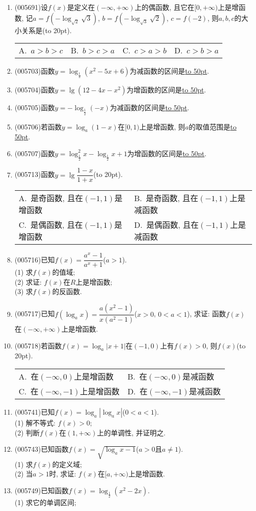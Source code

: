 \documentclass[10pt,a4paper]{article}
\newcommand{\blank}[1]{\underline{\hbox to #1pt{}}}
\newcommand{\bracket}[1]{(\hbox to #1pt{})}
\newcommand{\twoch}[4]{\par\begin{tabular}{p{.46\textwidth}p{.46\textwidth}}
A.~#1& B.~#2\\
C.~#3& D.~#4
\end{tabular}}
\newcommand{\fourch}[4]{\par\begin{tabular}{p{.23\textwidth}p{.23\textwidth}p{.23\textwidth}p{.23\textwidth}}
A.~#1 &B.~#2& C.~#3& D.~#4
\end{tabular}}
\begin{document}
\begin{enumerate}[1.]
\item {\tiny (005691)}设$f(x)$是定义在$(-\infty ,+\infty)$上的偶函数, 且它在$[0,+\infty)$上是增函数, 记$a=f(-\log_{\sqrt 2}\sqrt 3)$, $b=f(-\log_{\sqrt 3}\sqrt 2)$, $c=f(-2)$, 则$a,b,c$的大小关系是\bracket{20}.
\fourch{$a>b>c$}{$b>c>a$}{$c>a>b$}{$c>b>a$}
\item {\tiny (005703)}函数$y=\log_{\frac 13}(x^2-5x+6)$为减函数的区间是\blank{50}.
\item {\tiny (005704)}函数$y=\lg (12-4x-x^2)$为增函数的区间是\blank{50}.
\item {\tiny (005705)}函数$y=-\log_{\frac 12}(-x)$为减函数的区间是\blank{50}.
\item {\tiny (005706)}若函数$y=\log_a(1-x)$在$[0,1)$上是增函数, 则$a$的取值范围是\blank{50}.
\item {\tiny (005707)}函数$y=\log_{\frac 12}^2x-\log_{\frac 12}x+1$为增函数的区间是\blank{50}.
\item {\tiny (005713)}函数$y=\lg \dfrac{1-x}{1+x}$\bracket{20}.
\twoch{是奇函数, 且在$(-1, 1)$是增函数}{是奇函数, 且在$(-1, 1)$上是减函数}{是偶函数, 且在$(-1, 1)$是增函数}{是偶函数, 且在$(-1, 1)$上是减函数}
\item {\tiny (005716)}已知$f(x)=\dfrac{a^x-1}{a^x+1}$($a>1$).\\
(1) 求$f(x)$的值域;\\
(2) 求证: $f(x)$在$R$上是增函数;\\
(3) 求$f(x)$的反函数.
\item {\tiny (005717)}已知$f(\log_ax)=\dfrac{a(x^2-1)}{x(a^2-1)}$($x>0$, $0<a<1$), 求证: 函数$f(x)$在$(-\infty ,+\infty)$上是增函数.
\item {\tiny (005718)}若函数$f(x)=\log_a|x+1|$在$(-1, 0)$上有$f(x)>0$, 则$f(x)$\bracket{20}.
\twoch{在$(-\infty ,0)$上是增函数}{在$(-\infty ,0)$是减函数}{在$(-\infty ,-1)$上是增函数}{在$(-\infty ,-1)$是减函数}
\item {\tiny (005741)}已知$f(x)=\log_a|\log_ax|$($0<a<1$).\\
(1) 解不等式: $f(x)>0$;\\
(2) 判断$f(x)$在$(1,+\infty)$上的单调性, 并证明之.
\item {\tiny (005743)}已知函数$f(x)=\sqrt {\log_ax-1}$($a>0$且$a\ne 1$).\\
(1) 求$f(x)$的定义域;\\
(2) 当$a>1$时, 求证: $f(x)$在$[a,+\infty)$上是增函数.
\item {\tiny (005749)}已知函数$f(x)=\log_{\frac 12}(x^2-2x)$.\\
(1) 求它的单调区间;\\

\end{enumerate}
\end{document}
